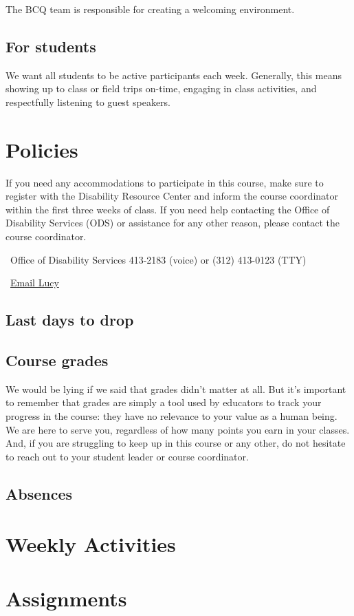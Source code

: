 \documentclass[]{article}
\begin{document}
The BCQ team is responsible for creating a welcoming environment. 

\subsection{For students}

We want all students to be active participants each week. Generally, this means showing up to class or field trips on-time, engaging in class activities, and respectfully listening to guest speakers.

\section{Policies}

If you need any accommodations to participate in this course, make sure to register with the Disability Resource Center and inform the course coordinator within the first three weeks of class. If you need help contacting the Office of Disability Services (ODS) or assistance for any other reason, please contact the course coordinator.

\faPhone\ Office of Disability Services 413-2183 (voice) or (312) 413-0123 (TTY)

\faLaptop\ \href{mailto:ldelan5@uic.edu}{Email Lucy}

\subsection{Last days to drop}

\subsection{Course grades}

We would be lying if we said that grades didn’t matter at all. But it’s important to remember that grades are simply a tool used by educators to track your progress in the course: they have no relevance to your value as a human being. We are here to serve you, regardless of how many points you earn in your classes. And, if you are struggling to keep up in this course or any other, do not hesitate to reach out to your student leader or course coordinator.

\subsection{Absences}

\section{Weekly Activities}

\section{Assignments}
\end{document}
